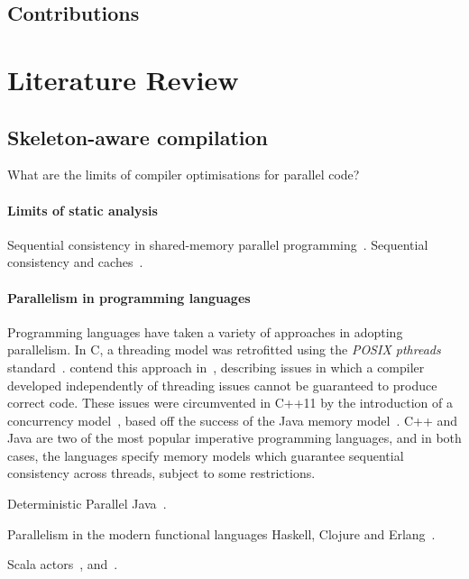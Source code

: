 
\subsection{Contributions}


\section{Literature Review}


\subsection{Skeleton-aware compilation}

What are the limits of compiler optimisations for parallel code?

\paragraph{Limits of static analysis} Sequential consistency in
shared-memory parallel
programming~\cite{Krishnamurthy1995,Shasha1988,Sura2005}. Sequential
consistency and caches~\cite{Goodman}.

\paragraph{Parallelism in programming languages} Programming languages
have taken a variety of approaches in adopting parallelism. In C, a
threading model was retrofitted using the \textit{POSIX pthreads}
standard~\cite{Sura2005}. \citeauthor{Boehm2005} contend this approach
in~\cite{Boehm2005}, describing issues in which a compiler developed
independently of threading issues cannot be guaranteed to produce
correct code. These issues were circumvented in C++11 by the
introduction of a concurrency model~\cite{Boehm2008}, based off the
success of the Java memory model~\cite{Bash2015a}. C++ and Java are
two of the most popular imperative programming languages, and in both
cases, the languages specify memory models which guarantee sequential
consistency across threads, subject to some restrictions.

Deterministic Parallel Java~\cite{Bocchino2009}.

Parallelism in the modern functional languages Haskell, Clojure and
Erlang~\cite{Pierro2012}.


Scala actors~\cite{Haller2009a}, and~\cite{Haller2012}.


